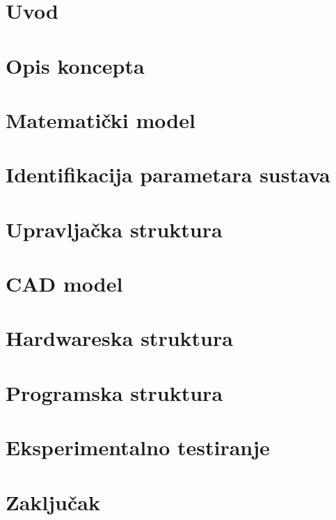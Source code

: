 \documentclass[11pt,a4paper]{article}
\begin{document}
\section{Uvod}


\newpage
\section{Opis koncepta} 


\newpage
\section{Matematički model}


\newpage
\section{Identifikacija parametara sustava}


\newpage
\section{Upravljačka struktura}


\newpage
\section{CAD model}


\newpage
\section{Hardwareska struktura}


\newpage
\section{Programska struktura}


\newpage
\section{Eksperimentalno testiranje}



\newpage
\section{Zaključak} 

\end{document}
